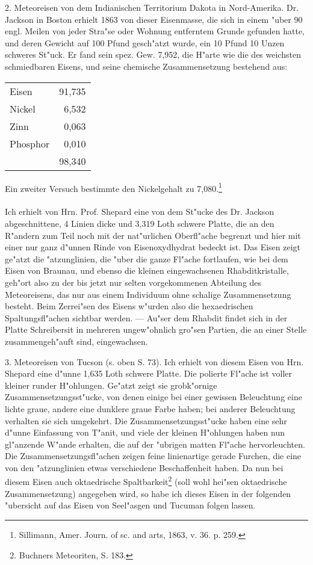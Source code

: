 \documentclass[a4paper, 11pt, oneside, german]{article}
\begin{document}
2. Meteoreisen von dem Indianischen Territorium Dakota in Nord-Amerika. Dr. Jackson in Boston erhielt 1863 von dieser Eisenmasse, die sich in einem "uber 90 engl. Meilen von jeder Stra"se oder Wohnung entferntem Grunde gefunden hatte, und deren Gewicht auf 100 Pfund gesch"atzt wurde, ein 10 Pfund 10 Unzen schweres St"uck. Er fand sein spez. Gew. 7,952, die H"arte wie die des weichsten schmiedbaren Eisens, und seine chemische Zusammensetzung bestehend aus:
\begin{center}
\begin{tabular}{ l r }
    Eisen & 91,735\\
    Nickel & 6,532\\
    Zinn & 0,063\\
    Phosphor & 0,010\\
     & 98,340\\
\end{tabular}
\end{center}
Ein zweiter Versuch bestimmte den Nickelgehalt zu 7,080.\footnote{Sillimann, Amer. Journ. of sc. and arts, 1863, v. 36. p. 259.}
\paragraph{}
Ich erhielt von Hrn. Prof. Shepard eine von dem St"ucke des Dr. Jackson abgeschnittene, 4 Linien dicke und 3,319 Loth schwere Platte, die an den R"andern zum Teil noch mit der nat"urlichen Oberfl"ache begrenzt und hier mit einer nur ganz d"unnen Rinde von Eisenoxydhydrat bedeckt ist. Das Eisen zeigt ge"atzt die "atzunglinien, die "uber die ganze Fl"ache fortlaufen, wie bei dem Eisen von Braunau, und ebenso die kleinen eingewachsenen Rhabditkristalle, geh"ort also zu der bis jetzt nur selten vorgekommenen Abteilung des Meteoreisens, das nur aus einem Individuum ohne schalige Zusammensetzung besteht. Beim Zerrei"sen des Eisens w"urden also die hexaedrischen Spaltungsfl"achen sichtbar werden. --- Au"ser dem Rhabdit findet sich in der Platte Schreibersit in mehreren ungew"ohnlich gro"sen Partien, die an einer Stelle zusammengeh"auft sind, eingewachsen.

3. Meteoreisen von Tucson (s. oben S. 73). Ich erhielt von diesem Eisen von Hrn. Shepard eine d"unne 1,635 Loth schwere Platte. Die polierte Fl"ache ist voller kleiner runder H"ohlungen. Ge"atzt zeigt sie grobk"ornige Zusammensetzungsst"ucke, von denen einige bei einer gewissen Beleuchtung eine lichte graue, andere eine dunklere graue Farbe haben; bei anderer Beleuchtung verhalten sie sich umgekehrt. Die Zusammensetzungsst"ucke haben eine sehr d"unne Einfassung von T"anit, und viele der kleinen H"ohlungen haben nun gl"anzende W"ande erhalten, die auf der "ubrigen matten Fl"ache hervorleuchten. Die Zusammensetzungsfl"achen zeigen feine linienartige gerade Furchen, die eine von den "atzunglinien etwas verschiedene Beschaffenheit haben. Da nun bei diesem Eisen auch oktaedrische Spaltbarkeit\footnote{Buchners Meteoriten, S. 183.} (soll wohl hei"sen oktaedrische Zusammensetzung) angegeben wird, so habe ich dieses Eisen in der folgenden "ubersicht auf das Eisen von Seel"asgen und Tucuman folgen lassen.
\end{document}

